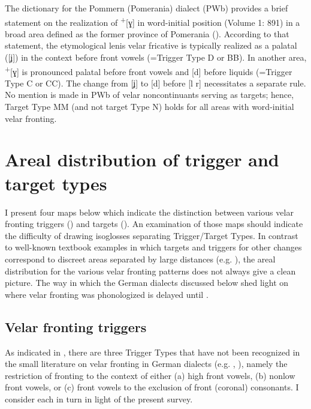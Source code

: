 The dictionary for the Pommern (Pomerania) dialect (PWb) provides a brief statement on the realization of  \textsuperscript{+}[ɣ] in word-initial position (Volume 1: 891) in a broad area defined as the former province of Pomerania (). According to that statement, the etymological lenis velar fricative is typically realized as a palatal ([ʝ]) in the context before front vowels (=Trigger Type D or BB). In another area,  \textsuperscript{+}[ɣ] is pronounced palatal before front vowels and [d] before liquids (=Trigger Type C or CC). The change from [ʝ] to [d] before [l r] necessitates a separate rule. No mention is made in PWb of velar noncontinuants serving as targets; hence, Target Type MM (and not target Type N) holds for all areas with word-initial velar fronting.

\section{{Areal} {distribution} {of} {trigger} {and} {target} {types}}\label{sec:12.4}

I present four maps below which indicate the distinction between various velar fronting triggers () and targets (). An examination of those maps should indicate the difficulty of drawing isoglosses separating Trigger/Target Types. In contrast to well-known textbook examples in which targets and triggers for other changes correspond to discreet areas separated by large distances (e.g. ), the areal distribution for the various velar fronting patterns does not always give a clean picture. The way in which the German dialects discussed below shed light on where velar fronting was phonologized is delayed until .

\subsection{Velar fronting triggers}\label{sec:12.4.1}

As indicated in , there are three Trigger Types that have not been recognized in the small literature on velar fronting in German dialects (e.g. \citealt{Herrgen1986}, \citealt{Robinson2001}), namely the restriction of fronting to the context of either (a) high front vowels, (b) nonlow front vowels, or (c) front vowels to the exclusion of front (coronal) consonants. I consider each in turn in light of the present survey.

